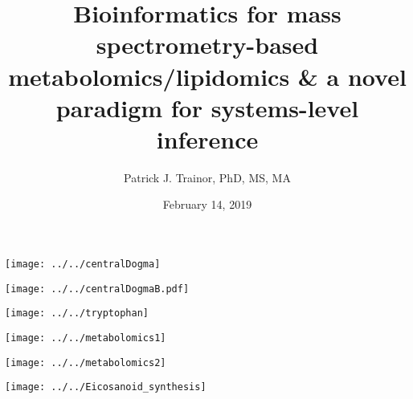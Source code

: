 \documentclass[xcolor=dvipsnames]{beamer}
\begin{document}
	
\title[Bioinformatics for MS and Systems Inference]{{\bf Bioinformatics for mass spectrometry-based metabolomics/lipidomics \& a novel paradigm for systems-level inference}}
\author[P.J. Trainor]{Patrick J. Trainor, PhD, MS, MA}
\date[February 2019]{February 14, 2019}

\begin{frame}
	\titlepage
\end{frame}

\begin{frame}
	\begin{center}
		\texttt{[image: ../../centralDogma]}
	\end{center}
\end{frame}

\begin{frame}
\begin{center}
	\texttt{[image: ../../centralDogmaB.pdf]}
\end{center}
\end{frame}

\begin{frame}
	\begin{center}
		\texttt{[image: ../../tryptophan]}
	\end{center}
\end{frame}

\begin{frame}
\begin{center}
	\texttt{[image: ../../metabolomics1]}
\end{center}
\end{frame}

\begin{frame}
\begin{center}
	\texttt{[image: ../../metabolomics2]}
\end{center}
\end{frame}

\begin{frame}
	\begin{center}
		\texttt{[image: ../../Eicosanoid\_synthesis]}
		
	\end{center}
\end{frame}
\end{document}
